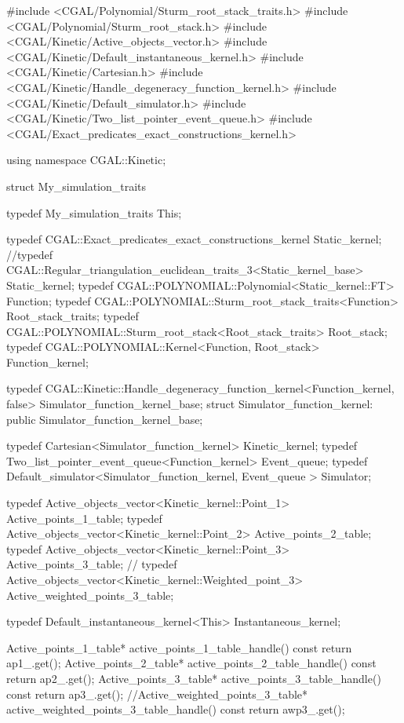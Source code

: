 \begin{ccExampleCode}

#include <CGAL/Polynomial/Sturm_root_stack_traits.h>
#include <CGAL/Polynomial/Sturm_root_stack.h>
#include <CGAL/Kinetic/Active_objects_vector.h>
#include <CGAL/Kinetic/Default_instantaneous_kernel.h>
#include <CGAL/Kinetic/Cartesian.h>
#include <CGAL/Kinetic/Handle_degeneracy_function_kernel.h>
#include <CGAL/Kinetic/Default_simulator.h>
#include <CGAL/Kinetic/Two_list_pointer_event_queue.h>
#include <CGAL/Exact_predicates_exact_constructions_kernel.h>

using namespace CGAL::Kinetic;

struct My_simulation_traits {
  typedef My_simulation_traits This;

  typedef CGAL::Exact_predicates_exact_constructions_kernel Static_kernel;
  //typedef CGAL::Regular_triangulation_euclidean_traits_3<Static_kernel_base> Static_kernel;
  typedef CGAL::POLYNOMIAL::Polynomial<Static_kernel::FT> Function;
  typedef CGAL::POLYNOMIAL::Sturm_root_stack_traits<Function> Root_stack_traits;
  typedef CGAL::POLYNOMIAL::Sturm_root_stack<Root_stack_traits> Root_stack;
  typedef CGAL::POLYNOMIAL::Kernel<Function, Root_stack> Function_kernel;

  typedef CGAL::Kinetic::Handle_degeneracy_function_kernel<Function_kernel, false>  Simulator_function_kernel_base;
  struct Simulator_function_kernel: public Simulator_function_kernel_base{};

  typedef Cartesian<Simulator_function_kernel> Kinetic_kernel;
  typedef Two_list_pointer_event_queue<Function_kernel> Event_queue;
  typedef Default_simulator<Simulator_function_kernel, Event_queue > Simulator;

  typedef Active_objects_vector<Kinetic_kernel::Point_1> Active_points_1_table;
  typedef Active_objects_vector<Kinetic_kernel::Point_2> Active_points_2_table;
  typedef Active_objects_vector<Kinetic_kernel::Point_3> Active_points_3_table;
  // typedef Active_objects_vector<Kinetic_kernel::Weighted_point_3> Active_weighted_points_3_table;
 
  typedef Default_instantaneous_kernel<This> Instantaneous_kernel;

  Active_points_1_table* active_points_1_table_handle() const { return ap1_.get();}
  Active_points_2_table* active_points_2_table_handle() const {return ap2_.get();}
  Active_points_3_table* active_points_3_table_handle() const {return ap3_.get();}
  //Active_weighted_points_3_table* active_weighted_points_3_table_handle() const {return awp3_.get();}

}
\end{ccExampleCode}
